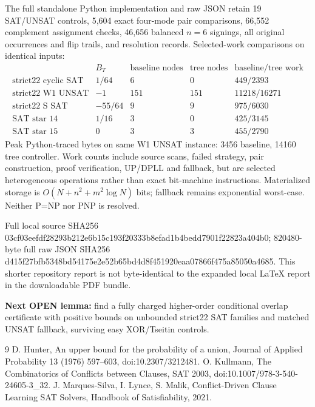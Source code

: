 \documentclass{article}
\begin{document}
The full standalone Python implementation and raw JSON retain 19 SAT/UNSAT controls, 5,604 exact four-mode pair comparisons, 66,552 complement assignment checks, 46,656 balanced $n=6$ signings, all original occurrences and flip trails, and resolution records. Selected-work comparisons on identical inputs:
\[
\begin{array}{lrrrr}
 &B_T&\text{baseline nodes}&\text{tree nodes}&\text{baseline/tree work}\\
\text{strict22 cyclic SAT}&1/64&6&0&449/2393\\
\text{strict22 W1 UNSAT}&-1&151&151&11218/16271\\
\text{strict22 S SAT}&-55/64&9&9&975/6030\\
\text{SAT star 14}&1/16&3&0&425/3145\\
\text{SAT star 15}&0&3&3&455/2790
\end{array}
\]
Peak Python-traced bytes on same W1 UNSAT instance: 3456 baseline, 14160 tree controller. Work counts include source scans, failed strategy, pair construction, proof verification, UP/DPLL and fallback, but are selected heterogeneous operations rather than exact bit-machine instructions. Materialized storage is $O(N+n^2+m^2\log N)$ bits; fallback remains exponential worst-case. Neither P=NP nor P\ne NP is resolved.

Full local source SHA256 03cf03eefdf28293b212e6b15c193f20333b8efad1b4bedd7901f22823a404b0; 820480-byte full raw JSON SHA256 d415f27bfb5348bd54175e2e52b65bd4d8f451920eaa07866f475a85050a4685. This shorter repository report is not byte-identical to the expanded local LaTeX report in the downloadable PDF bundle.
\par\noindent\textbf{Next OPEN lemma:} find a fully charged higher-order conditional overlap certificate with positive bounds on unbounded strict22 SAT families and matched UNSAT fallback, surviving easy XOR/Tseitin controls.

\begin{thebibliography}{9}
 D. Hunter, An upper bound for the probability of a union, Journal of Applied Probability 13 (1976) 597--603, doi:10.2307/3212481.
 O. Kullmann, The Combinatorics of Conflicts between Clauses, SAT 2003, doi:10.1007/978-3-540-24605-3\_32.
 J. Marques-Silva, I. Lynce, S. Malik, Conflict-Driven Clause Learning SAT Solvers, Handbook of Satisfiability, 2021.
\end{thebibliography}
\end{document}
